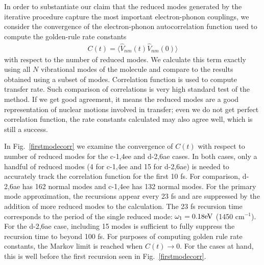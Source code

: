 In order to substantiate our claim that the reduced modes generated by the iterative
procedure capture the most important electron-phonon couplings, we consider the
convergence of the electron-phonon autocorrelation function used
to compute the golden-rule rate constants
\begin{eqnarray}
C(t) = \langle \hat V_{nm}(t) \hat V_{nm}(0)\rangle \label{c-of-t}
\end{eqnarray}
with respect to the number of reduced modes.  We
calculate  this term exactly using all $N$ vibrational modes of the molecule and
compare to the results obtained using a subset of modes. Correlation function is used to compute transfer rate. Such comparison of correlations is very high standard test of the method. If we get good agreement, it means the reduced modes are a good representation of nuclear motions involved in transfer; even we do not get perfect correlation function, the rate constants calculated may also agree well, which is still a success.


In Fig.~\ref{firstmodecorr}  we examine the convergence of $C(t)$ with respect to number of reduced modes for the c-1,4ee and d-2,6ae cases.
In both cases,  only a handful of reduced modes (4 for c-1,4ee and 15 for d-2,6ae)  is needed to  accurately track the
correlation function for the first 10 fs.   For comparison, d-2,6ae has 162 normal modes and c-1,4ee has 132 normal modes.
For the primary mode approximation, the recursions appear every 23 fs
and are suppressed by the addition of more reduced modes to the calculation.
The 23 fs recursion time corresponds to the period of the single reduced mode: $\omega_{1} = 0.18{\rm eV}$ (1450 cm$^{-1}$).
For the d-2,6ae case, including 15 modes is sufficient to fully suppress the recursion time to  beyond 100 fs.
 For purposes of computing golden rule rate constants,  the Markov limit is reached when
 $C(t)\to 0$.   For the cases at hand, this is well before the first recursion seen in Fig.~\ref{firstmodecorr}.

